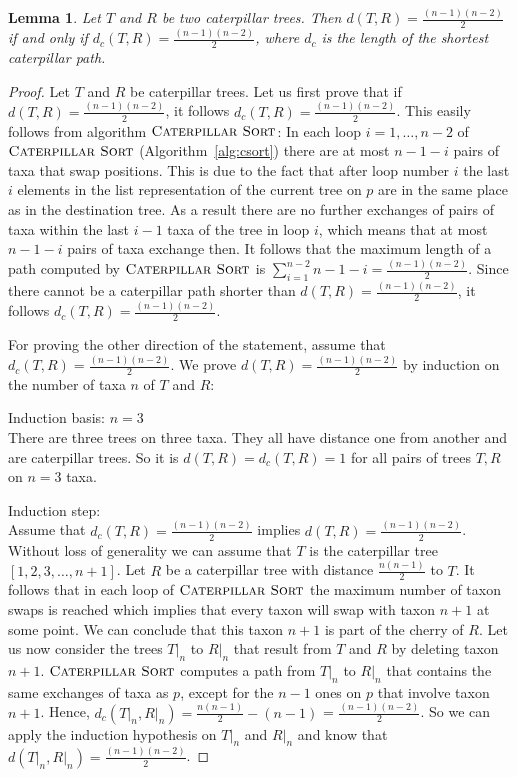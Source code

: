 \documentclass{amsart}
\newcommand{\csort}{\textsc{Caterpillar Sort}}
\newtheorem{lemma}[definition]{Lemma}
\begin{document}
\begin{lemma}
Let $T$ and $R$ be two caterpillar trees.
Then $d(T,R) = \frac{(n-1)(n-2)}{2}$ if and only if $d_c(T,R) = \frac{(n-1)(n-2)}{2}$, where $d_c$ is the length of the shortest caterpillar path.
\label{lemma:caterpillar_dist=diameter}
\end{lemma}

\begin{proof}
Let $T$ and $R$ be caterpillar trees.
Let us first prove that if $d(T,R) = \frac{(n-1)(n-2)}{2}$, it follows $d_c(T,R) = \frac{(n-1)(n-2)}{2}$.
This easily follows from algorithm $\csort$:
In each loop $i=1, \ldots, n-2$ of $\csort$ (Algorithm~\ref{alg:csort}) there are at most $n-1-i$ pairs of taxa that swap positions.
This is due to the fact that after loop number $i$ the last $i$ elements in the list representation of the current tree on $p$ are in the same place as in the destination tree.
As a result there are no further exchanges of pairs of taxa within the last $i-1$ taxa of the tree in loop $i$, which means that at most $n-1-i$ pairs of taxa exchange then.
It follows that the maximum length of a path computed by $\csort$ is $\sum\limits_{i=1}^{n-2} n-1-i = \frac{(n-1)(n-2)}{2}$.
Since there cannot be a caterpillar path shorter than $d(T,R) = \frac{(n-1)(n-2)}{2}$, it follows $d_c(T,R) = \frac{(n-1)(n-2)}{2}$.

For proving the other direction of the statement, assume that $d_c(T,R) = \frac{(n-1)(n-2)}{2}$.
We prove $d(T,R) = \frac{(n-1)(n-2)}{2}$ by induction on the number of taxa $n$ of $T$ and $R$:

Induction basis: $n=3$\\
There are three trees on three taxa.
They all have distance one from another and are caterpillar trees.
So it is $d(T,R) = d_c(T,R) = 1$ for all pairs of trees $T,R$ on $n=3$ taxa.

Induction step:\\
Assume that $d_c(T,R) = \frac{(n-1)(n-2)}{2}$ implies $d(T,R) = \frac{(n-1)(n-2)}{2}$.\\
Without loss of generality we can assume that $T$ is the caterpillar tree $[1,2,3,\ldots,n+1]$.
Let $R$ be a caterpillar tree with distance $\frac{n(n-1)}{2}$ to $T$.
It follows that in each loop of $\csort$ the maximum number of taxon swaps is reached which implies that every taxon will swap with taxon $n+1$ at some point.
We can conclude that this taxon $n+1$ is part of the cherry of $R$.
Let us now consider the trees $T{\big|}_n$ to $R{\big|}_n$ that result from $T$ and $R$ by deleting taxon $n+1$.
$\csort$ computes a path from $T{\big|}_n$ to $R{\big|}_n$ that contains the same exchanges of taxa as $p$, except for the $n-1$ ones on $p$ that involve taxon $n+1$.
Hence, $d_c(T{\big|}_n, R{\big|}_n) = \frac{n(n-1)}{2} - (n-1)$ = $\frac{(n-1)(n-2)}{2}$.
So we can apply the induction hypothesis on $T{\big|}_n$ and $R{\big|}_n$ and know that $d(T{\big|}_n,R{\big|}_n) = \frac{(n-1)(n-2)}{2}$.


\end{proof}
\end{document}
